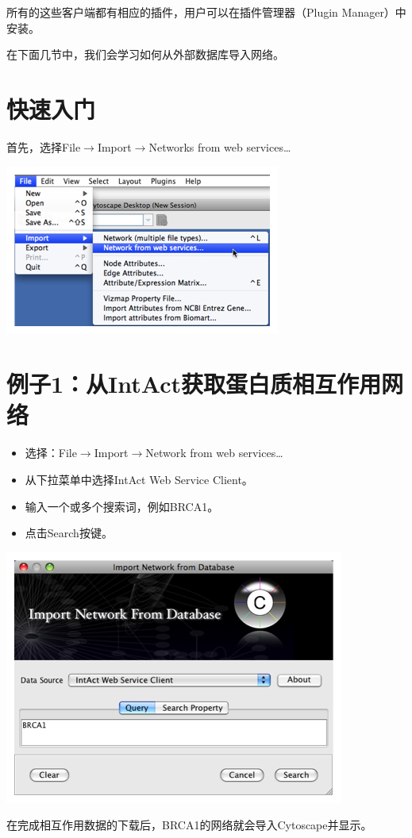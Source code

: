 所有的这些客户端都有相应的插件，用户可以在插件管理器（Plugin Manager）中安装。

在下面几节中，我们会学习如何从外部数据库导入网络。

\section{快速入门}
首先，选择File$\rightarrow$Import$\rightarrow$Networks from web services\ldots

\centerline{\includegraphics[width=.5\textwidth]{images/file_import.png}}

\centerline{}

\section{例子1：从IntAct获取蛋白质相互作用网络}
\begin{itemize}
\item 选择：File$\rightarrow$Import$\rightarrow$Network from web services\ldots
\item 从下拉菜单中选择IntAct Web Service Client。
\item 输入一个或多个搜索词，例如BRCA1。
\item 点击Search按键。
\end{itemize}

\centerline{\includegraphics[width=.5\textwidth]{images/intact_import.png}}

在完成相互作用数据的下载后，BRCA1的网络就会导入Cytoscape并显示。

